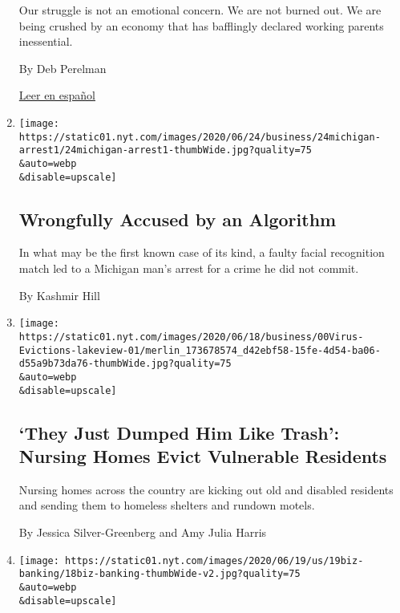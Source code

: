\begin{enumerate}
  Our struggle is not an emotional concern. We are not burned out. We
  are being crushed by an economy that has bafflingly declared working
  parents inessential.

  By Deb Perelman

  \href{https://www.nytimes.com/es/2020/07/09/espanol/estilos-de-vida/trabajo-hijos-coronavirus.html}{Leer
  en español}
\item
  \href{/2020/06/24/technology/facial-recognition-arrest.html}{}

  \texttt{[image: https://static01.nyt.com/images/2020/06/24/business/24michigan-arrest1/24michigan-arrest1-thumbWide.jpg?quality=75\\\&auto=webp\\\&disable=upscale]}

  \hypertarget{wrongfully-accused-by-an-algorithm}{%
  \subsection{Wrongfully Accused by an
  Algorithm}\label{wrongfully-accused-by-an-algorithm}}

  In what may be the first known case of its kind, a faulty facial
  recognition match led to a Michigan man's arrest for a crime he did
  not commit.

  By Kashmir Hill
\item
  \href{/2020/06/21/business/nursing-homes-evictions-discharges-coronavirus.html}{}

  \texttt{[image: https://static01.nyt.com/images/2020/06/18/business/00Virus-Evictions-lakeview-01/merlin\_173678574\_d42ebf58-15fe-4d54-ba06-d55a9b73da76-thumbWide.jpg?quality=75\\\&auto=webp\\\&disable=upscale]}

  \hypertarget{they-just-dumped-him-like-trash-nursing-homes-evict-vulnerable-residents}{%
  \subsection{`They Just Dumped Him Like Trash': Nursing Homes Evict
  Vulnerable
  Residents}\label{they-just-dumped-him-like-trash-nursing-homes-evict-vulnerable-residents}}

  Nursing homes across the country are kicking out old and disabled
  residents and sending them to homeless shelters and rundown motels.

  By Jessica Silver-Greenberg and Amy Julia Harris
\item
  \href{/2020/06/18/business/banks-black-customers-racism.html}{}

  \texttt{[image: https://static01.nyt.com/images/2020/06/19/us/19biz-banking/18biz-banking-thumbWide-v2.jpg?quality=75\\\&auto=webp\\\&disable=upscale]}


\end{enumerate}
